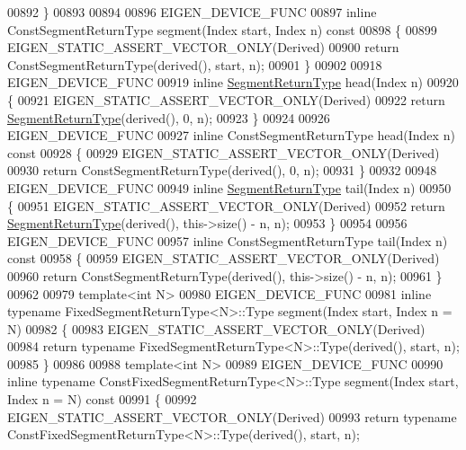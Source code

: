 \begin{DoxyCode}
00892 \}
00893 
00894 
00896 EIGEN\_DEVICE\_FUNC
00897 \textcolor{keyword}{inline} ConstSegmentReturnType segment(Index start, Index n)\textcolor{keyword}{ const}
00898 \textcolor{keyword}{}\{
00899   EIGEN\_STATIC\_ASSERT\_VECTOR\_ONLY(Derived)
00900   \textcolor{keywordflow}{return} ConstSegmentReturnType(derived(), start, n);
00901 \}
00902 
00918 EIGEN\_DEVICE\_FUNC
00919 \textcolor{keyword}{inline} \hyperlink{group___core___module_class_eigen_1_1_vector_block}{SegmentReturnType} head(Index n)
00920 \{
00921   EIGEN\_STATIC\_ASSERT\_VECTOR\_ONLY(Derived)
00922   \textcolor{keywordflow}{return} \hyperlink{group___core___module_class_eigen_1_1_vector_block}{SegmentReturnType}(derived(), 0, n);
00923 \}
00924 
00926 EIGEN\_DEVICE\_FUNC
00927 \textcolor{keyword}{inline} ConstSegmentReturnType head(Index n)\textcolor{keyword}{ const}
00928 \textcolor{keyword}{}\{
00929   EIGEN\_STATIC\_ASSERT\_VECTOR\_ONLY(Derived)
00930   \textcolor{keywordflow}{return} ConstSegmentReturnType(derived(), 0, n);
00931 \}
00932 
00948 EIGEN\_DEVICE\_FUNC
00949 \textcolor{keyword}{inline} \hyperlink{group___core___module_class_eigen_1_1_vector_block}{SegmentReturnType} tail(Index n)
00950 \{
00951   EIGEN\_STATIC\_ASSERT\_VECTOR\_ONLY(Derived)
00952   \textcolor{keywordflow}{return} \hyperlink{group___core___module_class_eigen_1_1_vector_block}{SegmentReturnType}(derived(), this->size() - n, n);
00953 \}
00954 
00956 EIGEN\_DEVICE\_FUNC
00957 \textcolor{keyword}{inline} ConstSegmentReturnType tail(Index n)\textcolor{keyword}{ const}
00958 \textcolor{keyword}{}\{
00959   EIGEN\_STATIC\_ASSERT\_VECTOR\_ONLY(Derived)
00960   \textcolor{keywordflow}{return} ConstSegmentReturnType(derived(), this->size() - n, n);
00961 \}
00962 
00979 \textcolor{keyword}{template}<\textcolor{keywordtype}{int} N>
00980 EIGEN\_DEVICE\_FUNC
00981 \textcolor{keyword}{inline} \textcolor{keyword}{typename} FixedSegmentReturnType<N>::Type segment(Index start, Index n = N)
00982 \{
00983   EIGEN\_STATIC\_ASSERT\_VECTOR\_ONLY(Derived)
00984   \textcolor{keywordflow}{return} \textcolor{keyword}{typename} FixedSegmentReturnType<N>::Type(derived(), start, n);
00985 \}
00986 
00988 \textcolor{keyword}{template}<\textcolor{keywordtype}{int} N>
00989 EIGEN\_DEVICE\_FUNC
00990 \textcolor{keyword}{inline} \textcolor{keyword}{typename} ConstFixedSegmentReturnType<N>::Type segment(Index start, Index n = N)\textcolor{keyword}{ const}
00991 \textcolor{keyword}{}\{
00992   EIGEN\_STATIC\_ASSERT\_VECTOR\_ONLY(Derived)
00993   \textcolor{keywordflow}{return} \textcolor{keyword}{typename} ConstFixedSegmentReturnType<N>::Type(derived(), start, n);

\end{DoxyCode}
